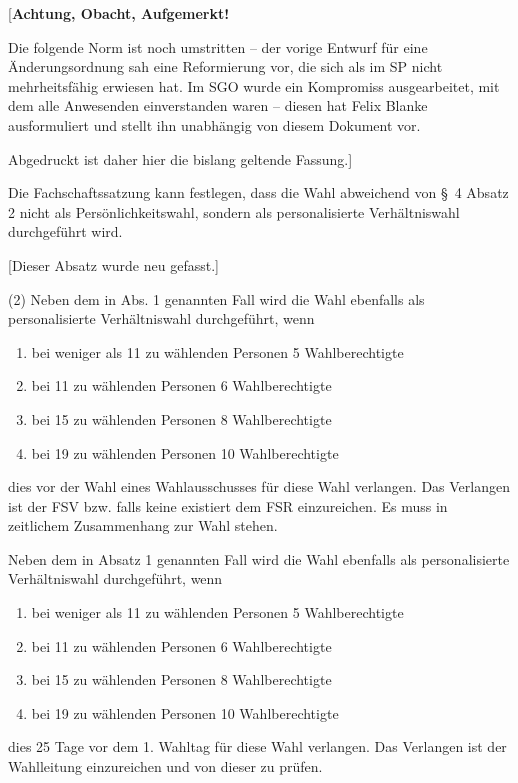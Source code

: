 \documentclass[%
draft,%
multilinesections%
]{fswo}
\newcommand\bemFr[1] {{\color{Red}[#1]}}
\newcommand\bemFe[1] {{\color{Cyan}[#1]}}
\newcommand\remark[1]{\begin{addmargin}{1cm}#1\end{addmargin}}
\newcommand\bemFr[1]{}%
\newcommand\bemFe[1]{}%
\newcommand\remark[1]{}
\begin{document}
\bemFr{\textbf{Achtung, Obacht, Aufgemerkt!}

Die folgende Norm ist noch umstritten – der vorige Entwurf für eine Änderungsordnung sah eine Reformierung vor, die sich als im SP nicht mehrheitsfähig erwiesen hat.
Im SGO wurde ein Kompromiss ausgearbeitet, mit dem alle Anwesenden einverstanden waren – diesen hat Felix Blanke ausformuliert und stellt ihn unabhängig von diesem Dokument vor.

Abgedruckt ist daher hier die bislang geltende Fassung.}


\begin{contract}
\label{cls-verhaeltniswahl}
Die Fachschaftssatzung kann festlegen, dass die Wahl abweichend von \S~4 Absatz 2 nicht als Persönlichkeitswahl, sondern als personalisierte Verhältniswahl durchgeführt wird.

\remark{%
\bemFe{Dieser Absatz wurde neu gefasst.}

\color{Gray}
(2) Neben dem in Abs. 1 genannten Fall wird die Wahl ebenfalls als personalisierte Verhältniswahl durchgeführt, wenn
\begin{enumerate}
\item bei weniger als 11 zu wählenden Personen 5 Wahlberechtigte
\item bei 11 zu wählenden Personen 6 Wahlberechtigte
\item bei 15 zu wählenden Personen 8 Wahlberechtigte
\item bei 19 zu wählenden Personen 10 Wahlberechtigte
\end{enumerate}
dies vor der Wahl eines Wahlausschusses für diese Wahl verlangen.
Das Verlangen ist der FSV bzw. falls keine existiert dem FSR einzureichen.
Es muss in zeitlichem Zusammenhang zur Wahl stehen.}

\begingroup
\makeatletter
  \ifFK@draft\color{Green}\fi
\makeatother
Neben dem in Absatz 1 genannten Fall wird die Wahl ebenfalls als
personalisierte Verhältniswahl durchgeführt, wenn
\begin{enumerate}
\item bei weniger als 11 zu wählenden Personen 5 Wahlberechtigte
\item bei 11 zu wählenden Personen 6 Wahlberechtigte
\item bei 15 zu wählenden Personen 8 Wahlberechtigte
\item bei 19 zu wählenden Personen 10 Wahlberechtigte
\end{enumerate}
dies 25 Tage vor dem 1. Wahltag für diese Wahl verlangen. Das Verlangen ist der Wahlleitung einzureichen und von dieser zu prüfen.
\endgroup


\end{contract}
\end{document}
